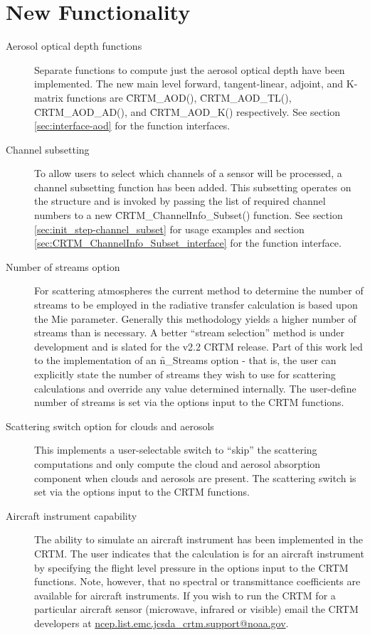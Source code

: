 \section*{New Functionality}

\begin{description}
\item[Aerosol optical depth functions] Separate functions to compute just the aerosol optical depth have been implemented. The new main level forward, tangent-linear, adjoint, and K-matrix functions are \f{CRTM\_AOD()}, \f{CRTM\_AOD\_TL()}, \f{CRTM\_AOD\_AD()}, and \f{CRTM\_AOD\_K()} respectively. See section \ref{sec:interface-aod} for the function interfaces.

\item[Channel subsetting] To allow users to select which channels of a sensor will be processed, a channel subsetting function has been added. This subsetting operates on the \ChannelInfo structure and is invoked by passing the list of required channel numbers to a new \f{CRTM\_ChannelInfo\_Subset()} function. See section \ref{sec:init_step-channel_subset} for usage examples and section \ref{sec:CRTM_ChannelInfo_Subset_interface} for the function interface.

\item[Number of streams option] For scattering atmospheres the current method to determine the number of streams to be employed in the radiative transfer calculation is based upon the Mie parameter. Generally this methodology yields a higher number of streams than is necessary. A better ``stream selection'' method is under development and is slated for the v2.2 CRTM release. Part of this work led to the implementation of an \f{n\_Streams} option - that is, the user can explicitly state the number of streams they wish to use for scattering calculations and override any value determined internally. The user-define number of streams is set via the options input to the CRTM functions.

\item[Scattering switch option for clouds and aerosols] This implements a user-selectable switch to ``skip'' the scattering computations and only compute the cloud and aerosol absorption component when clouds and aerosols are present. The scattering switch is set via the options input to the CRTM functions.

\item[Aircraft instrument capability] The ability to simulate an aircraft instrument has been implemented in the CRTM. The user indicates that the calculation is for an aircraft instrument by specifying the flight level pressure in the options input to the CRTM functions. Note, however, that no spectral or transmittance coefficients are available for aircraft instruments. If you wish to run the CRTM for a particular aircraft sensor (microwave, infrared or visible) email the CRTM developers at \href{mailto:ncep.list.emc.jcsda_crtm.support@noaa.gov}{ncep.list.emc.jcsda\_crtm.support@noaa.gov}.


\end{description}
